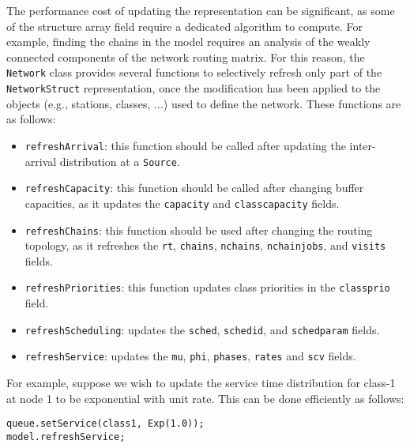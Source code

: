 The performance cost of updating the representation can be significant, as some of the structure array field require a dedicated algorithm to compute. For example, finding the chains in the model requires an analysis of the weakly connected components of the network routing matrix. For this reason, the \texttt{Network} class provides several functions to selectively refresh only part of the \texttt{NetworkStruct} representation, once the modification has been applied to the objects (e.g., stations, classes, ...) used to define the network. These functions are as follows:
\begin{itemize}
\item \texttt{refreshArrival}: this function should be called after updating the inter-arrival distribution at a \texttt{Source}. %
\item \texttt{refreshCapacity}: this function should be called after changing buffer capacities, as it updates the \texttt{capacity} and \texttt{classcapacity} fields.
\item \texttt{refreshChains}: this function should be used after changing the routing topology, as it refreshes the \texttt{rt}, \texttt{chains}, \texttt{nchains}, \texttt{nchainjobs}, and \texttt{visits} fields.
\item \texttt{refreshPriorities}: this function updates class priorities in the \texttt{classprio} field.
\item \texttt{refreshScheduling}: updates the \texttt{sched}, \texttt{schedid}, and \texttt{schedparam} fields.
\item \texttt{refreshService}: updates the \texttt{mu}, \texttt{phi}, \texttt{phases}, \texttt{rates} and \texttt{scv} fields.
\end{itemize}
For example, suppose we wish to update the service time distribution for class-1 at node 1 to be exponential with unit rate. This can be done efficiently as follows:
\begin{lstlisting}
queue.setService(class1, Exp(1.0));
model.refreshService;
\end{lstlisting}

